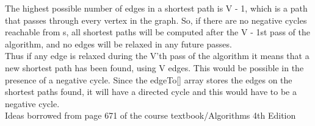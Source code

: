 \documentclass[11pt,fleqn]{article}
\begin{document}
\begin{enumerate}
The highest possible number of edges in a shortest path is V - 1, which is a path that passes through every vertex in the graph. So, if there are no negative cycles reachable from s, all shortest paths will be computed after the V - 1st pass of the algorithm, and no edges will be relaxed in any future passes.\\
Thus if any edge is relaxed during the V'th pass of the algorithm it means that a new shortest path has been found, using V edges. This would  be possible in the presence of a negative cycle. Since the edgeTo[] array stores the edges on the shortest paths found, it will have a directed cycle and this would have to be a negative cycle.\\


Ideas borrowed from page 671 of the course textbook/Algorithms 4th Edition


\end{enumerate}



	  
\end{document}
